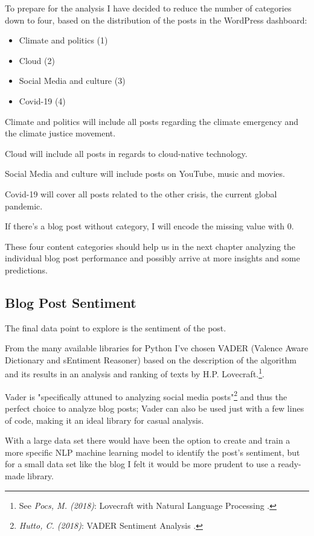 To prepare for the analysis I have decided to reduce the number of categories down to four, based on the distribution of the posts in the WordPress dashboard:

\begin{itemize}
\item Climate and politics (1)
\item Cloud (2)
\item Social Media and culture (3)
\item Covid-19 (4)
\end{itemize}

Climate and politics will include all posts regarding the climate emergency and the climate justice movement.

Cloud will include all posts in regards to cloud-native technology.

Social Media and culture will include posts on YouTube, music and movies.

Covid-19 will cover all posts related to the other crisis, the current global pandemic.

 If there's a blog post without category, I will encode the missing value with 0.

These four content categories should help us in the next chapter analyzing the individual blog post performance and possibly arrive at more insights and some predictions.

\subsection{Blog Post Sentiment}

The final data point to explore is the sentiment of the post.

From the many available libraries for Python I've chosen VADER (Valence Aware Dictionary and sEntiment Reasoner) based on the description of the algorithm and its results in an analysis and ranking of texts by H.P. Lovecraft.\footnote{See \textit{Pocs, M. (2018)}: Lovecraft with Natural Language Processing .\cite{lovecraftAnalysis}}.

Vader is "specifically attuned to analyzing social media posts"\footnote{\textit{Hutto, C. (2018)}: VADER Sentiment Analysis .\cite{vaderReadme}} and thus the perfect choice to analyze blog posts; Vader can also be used just with a few lines of code, making it an ideal library for casual analysis. 

With a large data set there would have been the option to create and train a more specific NLP machine learning model to identify the post's sentiment, but for a small data set like the blog I felt it would be more prudent to use a ready-made library.

